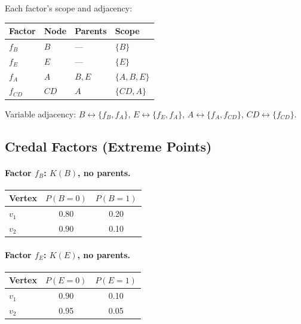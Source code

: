 \documentclass{article}
\begin{document}
\noindent Each factor's scope and adjacency:
\begin{center}
\begin{tabular}{llll}
\toprule
\textbf{Factor} & \textbf{Node} & \textbf{Parents} & \textbf{Scope} \\
\midrule
$f_B$ & $B$ & --- & $\{B\}$ \\
$f_E$ & $E$ & --- & $\{E\}$ \\
$f_A$ & $A$ & $B, E$ & $\{A, B, E\}$ \\
$f_{CD}$ & $CD$ & $A$ & $\{CD, A\}$ \\
\bottomrule
\end{tabular}
\end{center}

Variable adjacency: $B \leftrightarrow \{f_B, f_A\}$, \;
$E \leftrightarrow \{f_E, f_A\}$, \;
$A \leftrightarrow \{f_A, f_{CD}\}$, \;
$CD \leftrightarrow \{f_{CD}\}$.

\subsection{Credal Factors (Extreme Points)}

\paragraph{Factor $f_B$: $K(B)$, no parents.}
\begin{center}
\begin{tabular}{lcc}
\toprule
\textbf{Vertex} & $P(B{=}0)$ & $P(B{=}1)$ \\
\midrule
$v_1$ & 0.80 & 0.20 \\
$v_2$ & 0.90 & 0.10 \\
\bottomrule
\end{tabular}
\end{center}

\paragraph{Factor $f_E$: $K(E)$, no parents.}
\begin{center}
\begin{tabular}{lcc}
\toprule
\textbf{Vertex} & $P(E{=}0)$ & $P(E{=}1)$ \\
\midrule
$v_1$ & 0.90 & 0.10 \\
$v_2$ & 0.95 & 0.05 \\
\bottomrule
\end{tabular}
\end{center}
\end{document}
